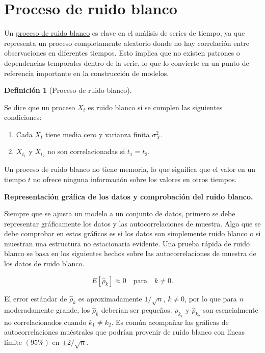 \documentclass[
  us-letterpaper,
]{scrreprt}
\providecommand{\tightlist}{%
  \setlength{\itemsep}{0pt}\setlength{\parskip}{0pt}}\usepackage{longtable,booktabs,array}
\theoremstyle{plain}
\theoremstyle{definition}
\newtheorem{definition}{Definición}[chapter]
\theoremstyle{definition}
\theoremstyle{remark}
\begin{document}
\section{Proceso de ruido blanco}\label{sec-ruidob}

Un \hyperref[sec-ruidob]{proceso de ruido blanco} es clave en el
análisis de series de tiempo, ya que representa un proceso completamente
aleatorio donde no hay correlación entre observaciones en diferentes
tiempos. Esto implica que no existen patrones o dependencias temporales
dentro de la serie, lo que lo convierte en un punto de referencia
importante en la construcción de modelos.

\begin{definition}[Proceso de ruido
blanco]\protect\hypertarget{def-ruidob}{}\label{def-ruidob}

Se dice que un proceso \(X_t\) es ruido blanco si se cumplen las
siguientes condiciones:

\begin{enumerate}
\def\labelenumi{\arabic{enumi}.}
\tightlist
\item
  Cada \(X_t\) tiene media cero y varianza finita \(\sigma^2_X\).
\item
  \(X_{t_1}\) y \(X_{t_2}\) no son correlacionadas si \(t_1=t_2\).
\end{enumerate}

\end{definition}

Un proceso de ruido blanco no tiene memoria, lo que significa que el
valor en un tiempo \(t\) no ofrece ninguna información sobre los valores
en otros tiempos.

\textbf{Representación gráfica de los datos y comprobación del ruido
blanco.}

Siempre que se ajusta un modelo a un conjunto de datos, primero se debe
representar gráficamente los datos y las autocorrelaciones de muestra.
Algo que se debe comprobar en estos gráficos es si los datos son
simplemente ruido blanco o si muestran una estructura no estacionaria
evidente. Una prueba rápida de ruido blanco se basa en los siguientes
hechos sobre las autocorrelaciones de muestra de los datos de ruido
blanco.

\[
E\left[ \hat{\rho}_k \right] \approx 0 \quad \text{para} \quad k \neq 0.
\]

El error estándar de \(\hat{\rho}_k\) es aproximadamente \(1/\sqrt{n}\),
\(k \neq 0\), por lo que para \(n\) moderadamente grande, los
\(\hat{\rho}_k\) deberían ser pequeños. \(\hat{\rho}_{k_1}\) y
\(\hat{\rho}_{k_2}\) son esencialmente no correlacionados cuando
\(k_1 \neq k_2\). Es común acompañar las gráficas de autocorrelaciones
muéstrales que podrían provenir de ruido blanco con líneas límite
\((95\%)\) en \(\pm 2/\sqrt{n}\).
\end{document}
